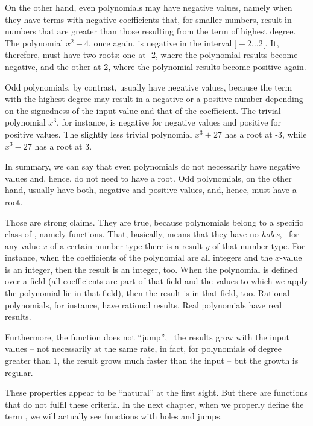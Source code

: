 \documentclass[tikz]{scrreprt}
\begin{document}
On the other hand, even polynomials may have negative values,
namely when they have terms with negative coefficients that, 
for smaller numbers,
result in numbers that are greater than those resulting from
the term of highest degree. 
The polynomial $x^2 - 4$, once again, is negative
in the interval $]-2\dots 2[$. It, therefore, must have two roots:
one at -2, where the polynomial results become negative, and the other at 2,
where the polynomial results become positive again.

Odd polynomials, by contrast, usually have negative values, because
the term with the highest degree may result in a negative or a
positive number depending on the signedness of the input value
and that of the coefficient.
The trivial polynomial $x^3$, for instance, is negative for
negative values and positive for positive values. The slightly
less trivial polynomial $x^3 + 27$ has a root at -3, while
$x^3 - 27$ has a root at 3.

In summary, we can say that even polynomials do not necessarily
have negative values and, hence, do not need to have a root.
Odd polynomials, on the other hand, usually have both, negative
and positive values, and, hence, must have a root.

Those are strong claims. They are true, because polynomials
belong to a specific class of , 
namely  functions.
That, basically, means that they have no \emph{holes}, \ie\
for any value $x$ of a certain number type there is a result $y$
of that number type. For instance, when the coefficients of the
polynomial are all integers and the $x$-value is an integer,
then the result is an integer, too. When the polynomial is defined
over a field (all coefficients are part of that field and
the values to which we apply the polynomial lie in that field),
then the result is in that field, too. Rational polynomials,
for instance, have rational results. 
Real polynomials have real results.

Furthermore, the function does not ``jump'', \ie\ the results
grow with the input values -- not necessarily
at the same rate, in fact, for polynomials of degree greater than 1,
the result grows much faster than the input -- but the growth
is regular.

These properties appear to be ``natural'' at the first sight.
But there are functions that do not fulfil these criteria.
In the next chapter, when we properly define the term ,
we will actually see functions with holes and jumps.
\end{document}
